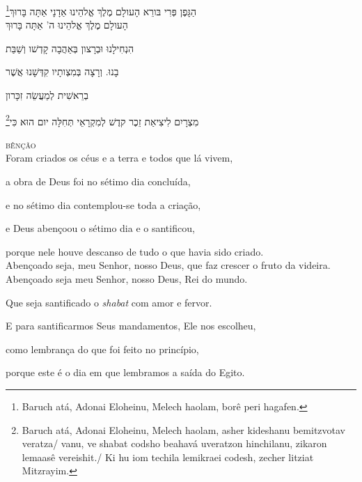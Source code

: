 \footnote{Baruch atá, Adonai Eloheinu, Melech haolam, borê peri hagafen.}הַגָּפֶן פְּרִי בּורֵא הָעולָם מֶלֶךְ אֱלהֵינוּ אַדָנָי אַתָּה בָּרוּךְ\\[10pt] 

הָעולָם מֶלֶךְ אֱלהֵינוּ ה' אַתָּה בָּרוּךְ

הִנְחִילָנוּ וּבְרָצון בְּאַהֲבָה קָדְשׁו וְשַׁבַּת

בָנוּ. וְרָצָה בְּמִצְותָיו קִדְּשָׁנוּ אֲשֶׁר

בְרֵאשִׁית לְמַעֲשֵׂה זִכָּרון

\footnote{Baruch atá, Adonai Eloheinu, Melech haolam, asher kideshanu bemitzvotav veratza/
vanu, ve shabat codsho beahavá uveratzon hinchilanu, zikaron lemaasê vereishit./
Ki hu iom techila lemikraei codesh, zecher litziat Mitzrayim.}מִצְרָיִם לִיצִיאַת זֵכֶר קדֶשׁ לְמִקְרָאֵי תְּחִלָּה יום הוּא כִּי\\[10pt]


\movetooddpage
\raggedright

\vspace*{1cm}

\textsc{bênção}\\[15pt]

Foram criados os céus e a terra e todos que lá vivem,

a obra de Deus foi no sétimo dia concluída,

e no sétimo dia contemplou-se toda a criação,

e Deus abençoou o sétimo dia e o santificou,

porque nele houve descanso \qb{}de tudo o que havia sido criado.\\[10pt]

Abençoado seja, meu Senhor, nosso Deus, \qb{}que faz crescer o fruto da videira.\\[10pt]

Abençoado seja meu Senhor, nosso Deus, Rei do mundo.

Que seja santificado o \textit{shabat} com amor e fervor.

E para santificarmos Seus mandamentos, \qb{}Ele nos escolheu,

como lembrança do que foi feito no princípio,

porque este é o dia em que lembramos a saída do Egito.\\[10pt]


\movetoevenpage
\raggedleft

\vspace*{1cm}


